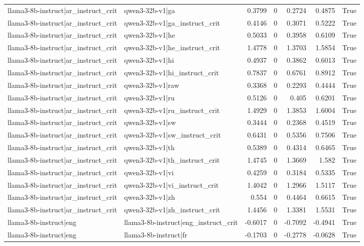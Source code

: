 \begin{table}
\begin{tabular}{l l r r r r l}
llama3-8b-instruct|ar_instruct_crit & qwen3-32b-v1|ga & 0.3799 & 0 & 0.2724 & 0.4875 & True \\
llama3-8b-instruct|ar_instruct_crit & qwen3-32b-v1|ga_instruct_crit & 0.4146 & 0 & 0.3071 & 0.5222 & True \\
llama3-8b-instruct|ar_instruct_crit & qwen3-32b-v1|he & 0.5033 & 0 & 0.3958 & 0.6109 & True \\
llama3-8b-instruct|ar_instruct_crit & qwen3-32b-v1|he_instruct_crit & 1.4778 & 0 & 1.3703 & 1.5854 & True \\
llama3-8b-instruct|ar_instruct_crit & qwen3-32b-v1|hi & 0.4937 & 0 & 0.3862 & 0.6013 & True \\
llama3-8b-instruct|ar_instruct_crit & qwen3-32b-v1|hi_instruct_crit & 0.7837 & 0 & 0.6761 & 0.8912 & True \\
llama3-8b-instruct|ar_instruct_crit & qwen3-32b-v1|raw & 0.3368 & 0 & 0.2293 & 0.4444 & True \\
llama3-8b-instruct|ar_instruct_crit & qwen3-32b-v1|ru & 0.5126 & 0 & 0.405 & 0.6201 & True \\
llama3-8b-instruct|ar_instruct_crit & qwen3-32b-v1|ru_instruct_crit & 1.4929 & 0 & 1.3853 & 1.6004 & True \\
llama3-8b-instruct|ar_instruct_crit & qwen3-32b-v1|sw & 0.3444 & 0 & 0.2368 & 0.4519 & True \\
llama3-8b-instruct|ar_instruct_crit & qwen3-32b-v1|sw_instruct_crit & 0.6431 & 0 & 0.5356 & 0.7506 & True \\
llama3-8b-instruct|ar_instruct_crit & qwen3-32b-v1|th & 0.5389 & 0 & 0.4314 & 0.6465 & True \\
llama3-8b-instruct|ar_instruct_crit & qwen3-32b-v1|th_instruct_crit & 1.4745 & 0 & 1.3669 & 1.582 & True \\
llama3-8b-instruct|ar_instruct_crit & qwen3-32b-v1|vi & 0.4259 & 0 & 0.3184 & 0.5335 & True \\
llama3-8b-instruct|ar_instruct_crit & qwen3-32b-v1|vi_instruct_crit & 1.4042 & 0 & 1.2966 & 1.5117 & True \\
llama3-8b-instruct|ar_instruct_crit & qwen3-32b-v1|zh & 0.554 & 0 & 0.4464 & 0.6615 & True \\
llama3-8b-instruct|ar_instruct_crit & qwen3-32b-v1|zh_instruct_crit & 1.4456 & 0 & 1.3381 & 1.5531 & True \\
llama3-8b-instruct|eng & llama3-8b-instruct|eng_instruct_crit & -0.6017 & 0 & -0.7092 & -0.4941 & True \\
llama3-8b-instruct|eng & llama3-8b-instruct|fr & -0.1703 & 0 & -0.2778 & -0.0628 & True \\

\end{tabular}
\end{table}

